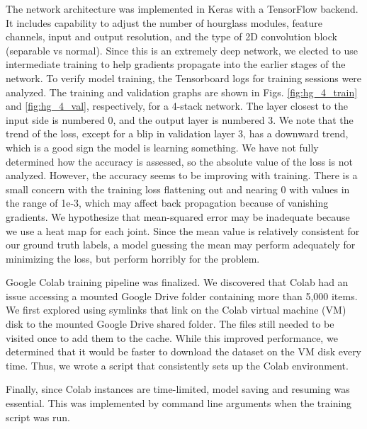 \documentclass[11pt, letterpaper]{article}
\begin{document}
The network architecture was implemented in Keras with a TensorFlow backend. It includes capability to adjust the number of hourglass modules, feature channels, input and output resolution, and the type of 2D convolution block (separable vs normal). Since this is an extremely deep network, we elected to use intermediate training to help gradients propagate into the earlier stages of the network. To verify model training, the Tensorboard logs for training sessions were analyzed. The training and validation graphs are shown in Figs. \ref{fig:hg_4_train} and \ref{fig:hg_4_val}, respectively, for a 4-stack network. The layer closest to the input side is numbered 0, and the output layer is numbered 3. We note that the trend of the loss, except for a blip in validation layer 3, has a downward trend, which is a good sign the model is learning something. We have not fully determined how the accuracy is assessed, so the absolute value of the loss is not analyzed. However, the accuracy seems to be improving with training. There is a small concern with the training loss flattening out and nearing 0 with values in the range of 1e-3, which may affect back propagation because of vanishing gradients. We hypothesize that mean-squared error may be inadequate because we use a heat map for each joint. Since the mean value is relatively consistent for our ground truth labels, a model guessing the mean may perform adequately for minimizing the loss, but perform horribly for the problem.

Google Colab training pipeline was finalized. We discovered that Colab had an issue accessing a mounted Google Drive folder containing more than 5,000 items. We first explored using symlinks that link on the Colab virtual machine (VM) disk to the mounted Google Drive shared folder. The files still needed to be visited once to add them to the cache. While this improved performance, we determined that it would be faster to download the dataset on the VM disk every time. Thus, we wrote a script that consistently sets up the Colab environment.

Finally, since Colab instances are time-limited, model saving and resuming was essential. This was implemented by command line arguments when the training script was run.



\end{document}
